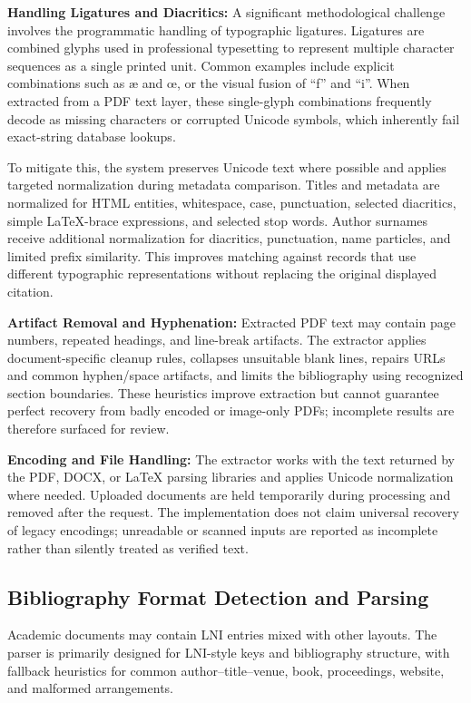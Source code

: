 \documentclass[12pt,a4paper,oneside]{report}
\begin{document}
\textbf{Handling Ligatures and Diacritics:} A significant methodological challenge involves the programmatic handling of typographic ligatures. Ligatures are combined glyphs used in professional typesetting to represent multiple character sequences as a single printed unit. Common examples include explicit combinations such as \ae{} and \oe{}, or the visual fusion of ``f'' and ``i''. When extracted from a PDF text layer, these single-glyph combinations frequently decode as missing characters or corrupted Unicode symbols, which inherently fail exact-string database lookups. 

To mitigate this, the system preserves Unicode text where possible and applies targeted normalization during metadata comparison. Titles and metadata are normalized for HTML entities, whitespace, case, punctuation, selected diacritics, simple LaTeX-brace expressions, and selected stop words. Author surnames receive additional normalization for diacritics, punctuation, name particles, and limited prefix similarity. This improves matching against records that use different typographic representations without replacing the original displayed citation.

\textbf{Artifact Removal and Hyphenation:} Extracted PDF text may contain page numbers, repeated headings, and line-break artifacts. The extractor applies document-specific cleanup rules, collapses unsuitable blank lines, repairs URLs and common hyphen/space artifacts, and limits the bibliography using recognized section boundaries. These heuristics improve extraction but cannot guarantee perfect recovery from badly encoded or image-only PDFs; incomplete results are therefore surfaced for review.

\textbf{Encoding and File Handling:} The extractor works with the text returned by the PDF, DOCX, or LaTeX parsing libraries and applies Unicode normalization where needed. Uploaded documents are held temporarily during processing and removed after the request. The implementation does not claim universal recovery of legacy encodings; unreadable or scanned inputs are reported as incomplete rather than silently treated as verified text.

\subsection{Bibliography Format Detection and Parsing}

Academic documents may contain LNI entries mixed with other layouts. The parser is primarily designed for LNI-style keys and bibliography structure, with fallback heuristics for common author--title--venue, book, proceedings, website, and malformed arrangements.
\end{document}
